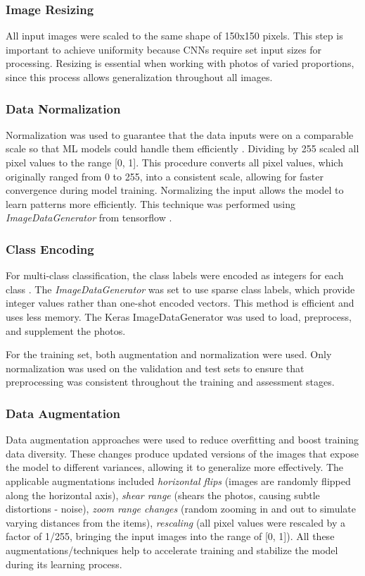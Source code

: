 \documentclass[conference]{IEEEtran}
\begin{document}
\subsubsection{Image Resizing}
All input images were scaled to the same shape of 150x150 pixels. This step is important to achieve uniformity because CNNs require set input sizes for processing. Resizing is essential when working with photos of varied proportions, since this process allows generalization throughout all images.

\subsubsection{Data Normalization}
Normalization was used to guarantee that the data inputs were on a comparable scale so that \ac{ML} models could handle them efficiently \cite{normalization}. Dividing by 255 scaled all pixel values to the range [0, 1]. This procedure converts all pixel values, which originally ranged from 0 to 255, into a consistent scale, allowing for faster convergence during model training. Normalizing the input allows the model to learn patterns more efficiently. This technique was performed using \textit{ImageDataGenerator} from tensorflow \cite{ImageDataGenerator}.

\subsubsection{Class Encoding}
For multi-class classification, the class labels were encoded as integers for each class \cite{encoding}. The \textit{ImageDataGenerator} was set to use sparse class labels, which provide integer values rather than one-shot encoded vectors. This method is efficient and uses less memory. The Keras ImageDataGenerator was used to load, preprocess, and supplement the photos.

For the training set, both augmentation and normalization were used. Only normalization was used on the validation and test sets to ensure that preprocessing was consistent throughout the training and assessment stages.

\subsubsection{Data Augmentation}
Data augmentation approaches were used to reduce overfitting and boost training data diversity. These changes produce updated versions of the images that expose the model to different variances, allowing it to generalize more effectively. The applicable augmentations included \textit{horizontal flips} (images are randomly flipped along the horizontal axis), \textit{shear range} (shears the photos, causing subtle distortions - noise), \textit{zoom range changes} (random zooming in and out to simulate varying distances from the items), \textit{rescaling} (all pixel values were rescaled by a factor of 1/255, bringing the input images into the range of [0, 1]). All these augmentations/techniques help to accelerate training and stabilize the model during its learning process.
\end{document}
